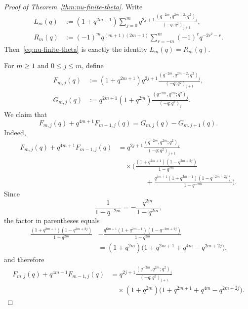 \documentclass[reqno]{amsart}
\theoremstyle{definition}
\theoremstyle{plain}
\theoremstyle{remark}
\numberwithin{equation}{section}
\begin{document}
\begin{proof}[Proof of Theorem~\ref{thm:nu-finite-theta}]
Write
\begin{align*}
L_m(q)&:=(1+q^{2m+1})\sum_{j=0}^{m} q^{2j+1}
\frac{(q^{-2m},q^{2m+2};q^2)_j}{(-q;q^2)_{j+1}},\\
R_m(q)&:=(-1)^m q^{(m+1)(2m+1)}
\sum_{r=-m}^{m} (-1)^r q^{-2r^2-r}.
\end{align*}
Then~\eqref{eq:nu-finite-theta} is exactly the identity $L_m(q)=R_m(q)$.

For $m\ge 1$ and $0\le j\le m$, define
\begin{align*}
F_{m,j}(q)&:=(1+q^{2m+1})q^{2j+1}
\frac{(q^{-2m},q^{2m+2};q^2)_j}{(-q;q^2)_{j+1}},\\
G_{m,j}(q)&:=q^{2m+1}(1+q^{2m})
\frac{(q^{-2m},q^{2m};q^2)_j}{(-q;q^2)_j}.
\end{align*}
We claim that
\begin{equation}\label{eq:nu-telescope}
F_{m,j}(q)+q^{4m+1}F_{m-1,j}(q)=G_{m,j}(q)-G_{m,j+1}(q).
\end{equation}
Indeed,
\begin{align*}
F_{m,j}(q)+q^{4m+1}F_{m-1,j}(q)
&=
q^{2j+1}\frac{(q^{-2m},q^{2m};q^2)_j}{(-q;q^2)_{j+1}}\\
&\quad\times\Biggl(
\frac{(1+q^{2m+1})(1-q^{2m+2j})}{1-q^{2m}}\\
&\qquad\qquad
+\frac{q^{4m+1}(1+q^{2m-1})(1-q^{-2m+2j})}{1-q^{-2m}}
\Biggr).
\end{align*}
Since
\[
\frac{1}{1-q^{-2m}}=-\frac{q^{2m}}{1-q^{2m}},
\]
the factor in parentheses equals
\[
\begin{aligned}
\frac{(1+q^{2m+1})(1-q^{2m+2j})}{1-q^{2m}}
&- \frac{q^{6m+1}(1+q^{2m-1})(1-q^{-2m+2j})}{1-q^{2m}}\\
&= (1+q^{2m})\bigl(1+q^{2m+1}+q^{4m}-q^{2m+2j}\bigr).
\end{aligned}
\]
and therefore
\begin{equation}\label{eq:nu-left-common}
\begin{aligned}
F_{m,j}(q)+q^{4m+1}F_{m-1,j}(q)
&=
q^{2j+1}\frac{(q^{-2m},q^{2m};q^2)_j}{(-q;q^2)_{j+1}}\\
&\quad\times(1+q^{2m})\bigl(1+q^{2m+1}+q^{4m}-q^{2m+2j}\bigr).
\end{aligned}
\end{equation}


\end{proof}
\end{document}
